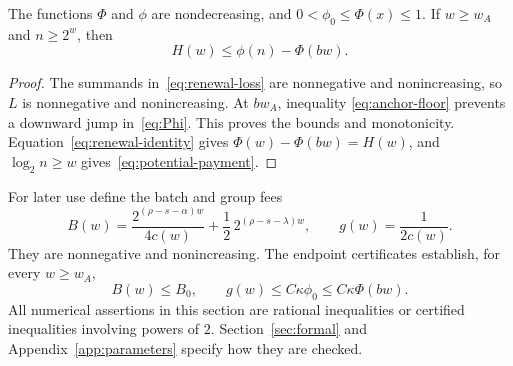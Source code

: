 \begin{lemma}\label{lem:potential}
The functions $\Phi$ and $\phi$ are nondecreasing, and
$0<\phi_0\le\Phi(x)\le1$. If $w\ge w_A$ and $n\ge2^w$, then
\begin{equation}\label{eq:potential-payment}
                   H(w)\le\phi(n)-\Phi(bw).
\end{equation}
\end{lemma}
\begin{proof}
The summands in~\eqref{eq:renewal-loss} are nonnegative and nonincreasing,
so $L$ is nonnegative and nonincreasing. At $bw_A$, inequality
\eqref{eq:anchor-floor} prevents a downward jump in~\eqref{eq:Phi}.
This proves the bounds and monotonicity. Equation~\eqref{eq:renewal-identity}
gives $\Phi(w)-\Phi(bw)=H(w)$, and
$\log_2n\ge w$ gives~\eqref{eq:potential-payment}.
\end{proof}

For later use define the batch and group fees
\begin{equation}\label{eq:batch-group-fees}
 B(w)=\frac{2^{(\rho-s-\alpha)w}}{4c(w)}
                +\frac12\,2^{(\rho-s-\lambda)w},
 \qquad g(w)=\frac1{2c(w)}.
\end{equation}
They are nonnegative and nonincreasing. The endpoint certificates establish,
for every $w\ge w_A$,
\begin{equation}\label{eq:fee-endpoints}
          B(w)\le B_0,\qquad g(w)\le C\kappa\phi_0
                                  \le C\kappa\Phi(bw).
\end{equation}
All numerical assertions in this section are rational inequalities or
certified inequalities involving powers of $2$. Section~\ref{sec:formal}
and Appendix~\ref{app:parameters} specify how they are checked.
